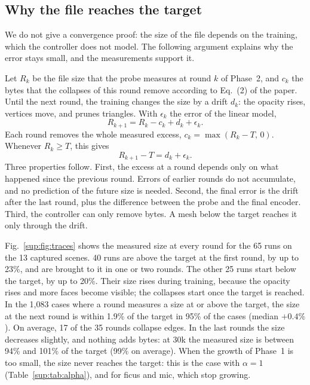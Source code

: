 \subsection{Why the file reaches the target}
We do not give a convergence proof: the size of the file depends on the training, which the controller does not model. The following argument explains why the error stays small, and the measurements support it.

Let $R_k$ be the file size that the probe measures at round $k$ of Phase~2, and $c_k$ the bytes that the collapses of this round remove according to Eq.~(2) of the paper. Until the next round, the training changes the size by a drift $d_k$: the opacity rises, vertices move, and \MS prunes triangles. With $\epsilon_k$ the error of the linear model,
\begin{equation}
R_{k+1} = R_k - c_k + d_k + \epsilon_k .
\end{equation}
Each round removes the whole measured excess, $c_k = \max(R_k - T,\, 0)$. Whenever $R_k \ge T$, this gives
\begin{equation}
R_{k+1} - T = d_k + \epsilon_k .
\label{sup:eq:excess}
\end{equation}
Three properties follow. First, the excess at a round depends only on what happened since the previous round. Errors of earlier rounds do not accumulate, and no prediction of the future size is needed. Second, the final error is the drift after the last round, plus the difference between the probe and the final encoder. Third, the controller can only remove bytes. A mesh below the target reaches it only through the drift.

Fig.~\ref{sup:fig:traces} shows the measured size at every round for the 65 runs on the 13 captured scenes. 40 runs are above the target at the first round, by up to 23\%, and are brought to it in one or two rounds. The other 25 runs start below the target, by up to 20\%. Their size rises during training, because the opacity rises and more faces become visible; the collapses start once the target is reached. In the 1{,}083 cases where a round measures a size at or above the target, the size at the next round is within 1.9\% of the target in 95\% of the cases (median $+0.4\%$). On average, 17 of the 35 rounds collapse edges. In the last rounds the size decreases slightly, and nothing adds bytes: at 30k the measured size is between 94\% and 101\% of the target (99\% on average). When the growth of Phase~1 is too small, the size never reaches the target: this is the case with $\alpha = 1$ (Table~\ref{sup:tab:alpha}), and for ficus and mic, which stop growing.

